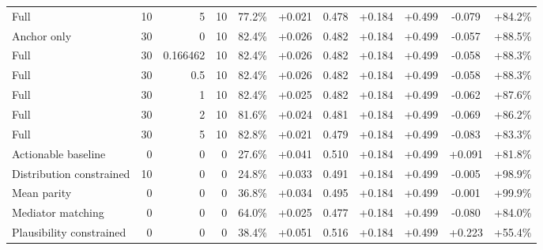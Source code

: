 \begin{table}[htbp]
\begin{tabular}{lrrrccccccc}
Full & 10 & 5 & 10 & 77.2\% & +0.021 & 0.478 & +0.184 & +0.499 & -0.079 & +84.2\% \\
Anchor only & 30 & 0 & 10 & 82.4\% & +0.026 & 0.482 & +0.184 & +0.499 & -0.057 & +88.5\% \\
Full & 30 & 0.166462 & 10 & 82.4\% & +0.026 & 0.482 & +0.184 & +0.499 & -0.058 & +88.3\% \\
Full & 30 & 0.5 & 10 & 82.4\% & +0.026 & 0.482 & +0.184 & +0.499 & -0.058 & +88.3\% \\
Full & 30 & 1 & 10 & 82.4\% & +0.025 & 0.482 & +0.184 & +0.499 & -0.062 & +87.6\% \\
Full & 30 & 2 & 10 & 81.6\% & +0.024 & 0.481 & +0.184 & +0.499 & -0.069 & +86.2\% \\
Full & 30 & 5 & 10 & 82.8\% & +0.021 & 0.479 & +0.184 & +0.499 & -0.083 & +83.3\% \\
Actionable baseline & 0 & 0 & 0 & 27.6\% & +0.041 & 0.510 & +0.184 & +0.499 & +0.091 & +81.8\% \\
Distribution constrained & 10 & 0 & 0 & 24.8\% & +0.033 & 0.491 & +0.184 & +0.499 & -0.005 & +98.9\% \\
Mean parity & 0 & 0 & 0 & 36.8\% & +0.034 & 0.495 & +0.184 & +0.499 & -0.001 & +99.9\% \\
Mediator matching & 0 & 0 & 0 & 64.0\% & +0.025 & 0.477 & +0.184 & +0.499 & -0.080 & +84.0\% \\
Plausibility constrained & 0 & 0 & 0 & 38.4\% & +0.051 & 0.516 & +0.184 & +0.499 & +0.223 & +55.4\% \\
\bottomrule
\end{tabular}
\end{table}